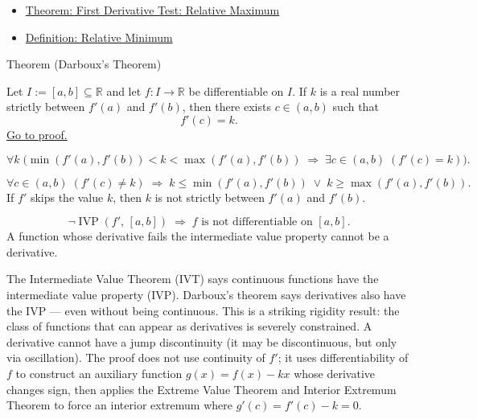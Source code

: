 \begin{remark*}[Dependencies]
\begin{itemize}
  \item \hyperref[thm:first-derivative-test-maximum]{Theorem: First Derivative Test: Relative Maximum}
  \item \hyperref[def:relative-minimum]{Definition: Relative Minimum}
\end{itemize}
\end{remark*}


\begin{theorembox}{Theorem (Darboux's Theorem)}
\begin{theorem}
\label{thm:darboux}
Let $I := [a,b] \subseteq \mathbb{R}$ and let $f : I \to \mathbb{R}$ be differentiable on $I$. If $k$ is a real number strictly between $f'(a)$ and $f'(b)$, then there exists $c \in (a,b)$ such that
\[
f'(c) = k.
\]
\hyperref[prf:darboux]{Go to proof.}
\end{theorem}
\end{theorembox}

\begin{remark*}
\[
\forall k\;\bigl(\min(f'(a),f'(b)) < k < \max(f'(a),f'(b))
\;\Rightarrow\; \exists c \in (a,b)\;(f'(c)=k)\bigr).
\]
\end{remark*}

\begin{remark*}
\[
\forall c \in (a,b)\;(f'(c) \neq k)
\;\Rightarrow\;
k \leq \min(f'(a),f'(b)) \;\lor\; k \geq \max(f'(a),f'(b)).
\]
If $f'$ skips the value $k$, then $k$ is not strictly between $f'(a)$ and $f'(b)$.
\end{remark*}

\begin{remark*}
\[
\lnot\operatorname{IVP}(f',\,[a,b]) \;\Rightarrow\; f \text{ is not differentiable on } [a,b].
\]
A function whose derivative fails the intermediate value property cannot be a derivative.
\end{remark*}

\begin{remark*}[Interpretation]
The Intermediate Value Theorem (IVT) says continuous functions have the intermediate value property (IVP). Darboux's theorem says derivatives also have the IVP --- even without being continuous. This is a striking rigidity result: the class of functions that can appear as derivatives is severely constrained. A derivative cannot have a jump discontinuity (it may be discontinuous, but only via oscillation). The proof does not use continuity of $f'$; it uses differentiability of $f$ to construct an auxiliary function $g(x) = f(x) - kx$ whose derivative changes sign, then applies the Extreme Value Theorem and Interior Extremum Theorem to force an interior extremum where $g'(c) = f'(c) - k = 0$.
\end{remark*}

